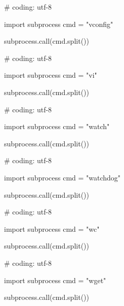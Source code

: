 \begin{mylisting}[label={lst:acpid},language=sh,caption=vconfig]

# coding: utf-8

import subprocess
cmd = "vconfig"

subprocess.call(cmd.split())

\end{mylisting}

\begin{mylisting}[label={lst:acpid},language=sh,caption=vi]

# coding: utf-8

import subprocess
cmd = "vi"

subprocess.call(cmd.split())

\end{mylisting}

\begin{mylisting}[label={lst:acpid},language=sh,caption=watch]

# coding: utf-8

import subprocess
cmd = "watch"

subprocess.call(cmd.split())

\end{mylisting}

\begin{mylisting}[label={lst:acpid},language=sh,caption=watchdog]

# coding: utf-8

import subprocess
cmd = "watchdog"

subprocess.call(cmd.split())

\end{mylisting}

\begin{mylisting}[label={lst:acpid},language=sh,caption=wc]

# coding: utf-8

import subprocess
cmd = "wc"

subprocess.call(cmd.split())

\end{mylisting}

\begin{mylisting}[label={lst:acpid},language=sh,caption=wget]

# coding: utf-8

import subprocess
cmd = "wget"

subprocess.call(cmd.split())

\end{mylisting}

